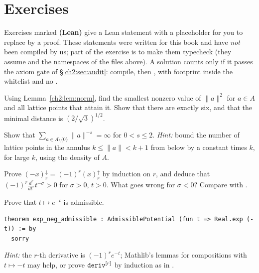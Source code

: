 \section{Exercises}\label{ch2:sec:ex}

Exercises marked \textbf{(Lean)} give a Lean statement with a  placeholder for you to replace by a proof.
These statements were written for this book and have \emph{not} been compiled by us; part of the exercise is to make
them typecheck (they assume  and the namespaces of the files above). A
solution counts only if it passes the axiom gate of \S\ref{ch2:sec:audit}: compile, then , with
footprint inside the whitelist and no .

\begin{exercise}\label{ch2:ex:neigh}
Using Lemma~\ref{ch2:lem:norm}, find the smallest nonzero value of $\|a\|^2$ for $a\in A$ and all lattice points that
attain it. Show that there are exactly six, and that the minimal distance is $(2/\sqrt3)^{1/2}$.
\end{exercise}

\begin{exercise}\label{ch2:ex:diverge}
Show that $\sum_{a\in A\setminus\{0\}}\|a\|^{-s}=\infty$ for $0<s\le2$. \emph{Hint:} bound the number of lattice points
in the annulus $k\le\|a\|<k+1$ from below by a constant times $k$, for large $k$, using the density of $A$.
\end{exercise}

\begin{exercise}\label{ch2:ex:poch}
Prove $(-x)^{\downarrow}_r=(-1)^r(x)^{\uparrow}_r$ by induction on $r$, and deduce that $(-1)^r\frac{d^r}{dt^r}t^{-\sigma}>0$
for $\sigma>0$, $t>0$. What goes wrong for $\sigma<0$? Compare with .
\end{exercise}

\begin{exercise}[Lean]\label{ch2:ex:exp}
Prove that $t\mapsto e^{-t}$ is admissible.
\begin{lstlisting}[language=Lean]
theorem exp_neg_admissible : AdmissiblePotential (fun t => Real.exp (-t)) := by
  sorry
\end{lstlisting}
\emph{Hint:} the $r$-th derivative is $(-1)^re^{-t}$; Mathlib's  lemmas for compositions with
$t\mapsto -t$ may help, or prove $\lean{deriv}^{[r]}$ by induction as in .
\end{exercise}

